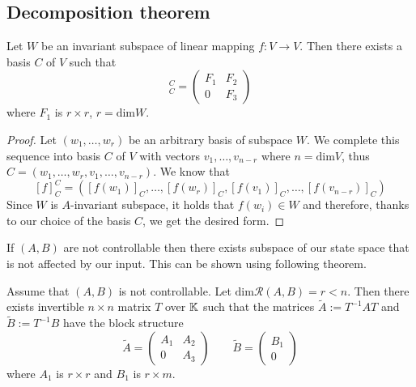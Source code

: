 \subsection{Decomposition theorem}

\begin{lemma}
	\label{lem:invsubspc}
	Let $W$ be an invariant subspace of linear mapping $f\colon V \rightarrow V$. Then there exists a basis $C$ of $V$ such that 
	\begin{equation*}
		[f]^C_C=
		\begin{pmatrix}
			F_1 & F_2 \\
			0   & F_3 
		\end{pmatrix}
	\end{equation*}
	where $F_1$ is $r\times r$, $r=\text{dim}W$.
\end{lemma}

\begin{proof}
	Let $(w_1,\ldots,w_r)$ be an arbitrary basis of subspace $W$. We complete this sequence into basis $C$ of $V$ with vectors $v_1,\ldots,v_{n-r}$ where $n=\text{dim}V$, thus $C=(w_1,\ldots,w_r,v_1,\ldots,v_{n-r})$. We know that $$[f]^C_C=([f(w_1)]_C,\ldots,[f(w_r)]_C,[f(v_1)]_C,\ldots,[f(v_{n-r})]_C)$$ Since $W$ is $A$-invariant subspace, it holds that $f(w_i)\in W$ and therefore, thanks to our choice of the basis $C$, we get the desired form.
\end{proof}

If $(A,B)$ are not controllable then there exists subspace of our state space that is not affected by our input. This can be shown using following theorem.

\begin{theorem}
	\label{theorem:decomp}
	Assume that $(A,B)$ is not controllable. Let $\text{dim}\mathcal{R}(A,B)=r<n$. Then there exists invertible $n\times n$ matrix $T$ over $\mathbb{K}$ such that the matrices $\widetilde{A}:=T^{-1}AT$ and $\widetilde{B}:=T^{-1}B$ have the block structure 
	\begin{equation*}
		\widetilde{A}=
		\begin{pmatrix}
			A_1 & A_2 \\
			0   & A_3 
		\end{pmatrix}
		\qquad
		\widetilde{B}=
		\begin{pmatrix}
			B_1  \\
			0
		\end{pmatrix}
	\end{equation*}
	where $A_1$ is $r \times r$ and $B_1$ is $r \times m$.
\end{theorem}

